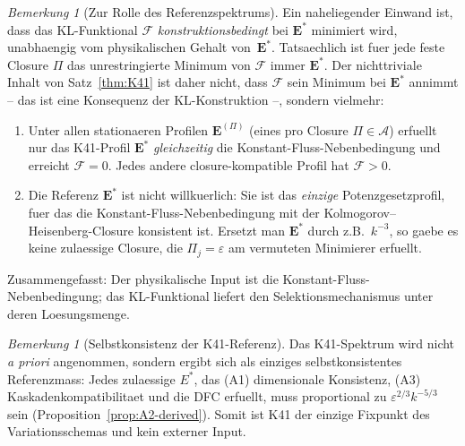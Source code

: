 \documentclass[12pt,a4paper]{article}
\theoremstyle{definition}
\theoremstyle{plain}
\theoremstyle{remark}
\newtheorem{remark}[definition]{Bemerkung}
\begin{document}
\begin{remark}[Zur Rolle des Referenzspektrums]\label{rem:circularity}
Ein naheliegender Einwand ist, dass das KL-Funktional $\mathcal{F}$
\emph{konstruktionsbedingt} bei $\mathbf{E}^*$ minimiert wird, unabhaengig
vom physikalischen Gehalt von~$\mathbf{E}^*$. Tatsaechlich ist fuer jede
feste Closure $\Pi$ das unrestringierte Minimum von $\mathcal{F}$ immer
$\mathbf{E}^*$. Der nichttriviale Inhalt von Satz~\ref{thm:K41} ist
daher nicht, dass $\mathcal{F}$ sein Minimum bei $\mathbf{E}^*$ annimmt
-- das ist eine Konsequenz der KL-Konstruktion --, sondern vielmehr:
\begin{enumerate}
\item Unter allen stationaeren Profilen $\mathbf{E}^{(\Pi)}$ (eines pro
  Closure $\Pi \in \mathscr{A}$) erfuellt nur das K41-Profil
  $\mathbf{E}^*$ \emph{gleichzeitig} die Konstant-Fluss-Nebenbedingung
  und erreicht $\mathcal{F} = 0$. Jedes andere closure-kompatible Profil
  hat $\mathcal{F} > 0$.
\item Die Referenz $\mathbf{E}^*$ ist nicht willkuerlich: Sie ist das
  \emph{einzige} Potenzgesetzprofil, fuer das die Konstant-Fluss-Nebenbedingung
  mit der Kolmogorov--Heisenberg-Closure konsistent ist. Ersetzt man
  $\mathbf{E}^*$ durch z.B.\ $k^{-3}$, so gaebe es keine zulaessige Closure,
  die $\Pi_j = \varepsilon$ am vermuteten Minimierer erfuellt.
\end{enumerate}
Zusammengefasst: Der physikalische Input ist die Konstant-Fluss-Nebenbedingung;
das KL-Funktional liefert den Selektionsmechanismus unter deren Loesungsmenge.
\end{remark}

\begin{remark}[Selbstkonsistenz der K41-Referenz]
\label{rem:k41-selfconsistency}
Das K41-Spektrum wird nicht \emph{a priori} angenommen, sondern ergibt sich als einziges selbstkonsistentes Referenzmass: Jedes zulaessige $E^*$, das (A1) dimensionale Konsistenz, (A3) Kaskadenkompatibilitaet und die DFC erfuellt, muss proportional zu $\varepsilon^{2/3} k^{-5/3}$ sein (Proposition~\ref{prop:A2-derived}). Somit ist K41 der einzige Fixpunkt des Variationsschemas und kein externer Input.
\end{remark}
\end{document}
